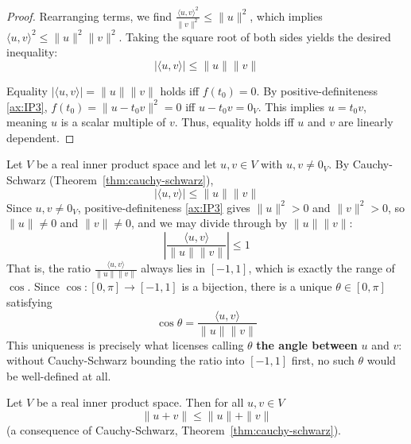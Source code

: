 \begin{proof}
			Rearranging terms, we find $\frac{\langle u, v \rangle^2}{\|v\|^2} \le \|u\|^2$, which implies $\langle u, v \rangle^2 \le \|u\|^2 \|v\|^2$. Taking the square root of both sides yields the desired inequality:
			\[ 
				|\langle u, v \rangle| \le \|u\| \|v\|
			\]
			
			Equality $|\langle u, v \rangle| = \|u\| \|v\|$ holds iff $f(t_0) = 0$. By positive-definiteness \ref{ax:IP3}, $f(t_0) = \|u - t_0v\|^2 = 0$ iff $u - t_0v = 0_V$. This implies $u = t_0v$, meaning $u$ is a scalar multiple of $v$. Thus, equality holds iff $u$ and $v$ are linearly dependent.
		\end{proof}
		
		\begin{remark}
			\label{rem:angle-between-vectors}
			Let $V$ be a real inner product space and let $u, v \in V$ with $u, v \neq 0_V$. By Cauchy-Schwarz (Theorem~\ref{thm:cauchy-schwarz}),
			\[
				|\langle u, v \rangle| \le \|u\|\|v\|
			\]
			Since $u, v \neq 0_V$, positive-definiteness \ref{ax:IP3} gives $\|u\|^2 > 0$ and $\|v\|^2 > 0$, so $\|u\| \neq 0$ and $\|v\| \neq 0$, and we may divide through by $\|u\|\|v\|$:
			\[
				\left| \frac{\langle u,v \rangle}{\|u\|\|v\|} \right| \le 1
			\]
			That is, the ratio $\frac{\langle u, v \rangle}{\|u\|\|v\|}$ always lies in $[-1,1]$, which is exactly the range of $\cos$. Since $\cos : [0,\pi] \to [-1,1]$ is a bijection, there is a unique $\theta \in [0,\pi]$ satisfying
			\[
				\cos\theta = \frac{\langle u,v \rangle}{\|u\|\|v\|}
			\]
			This uniqueness is precisely what licenses calling $\theta$ \textbf{the angle between} $u$ and $v$: without Cauchy-Schwarz bounding the ratio into $[-1,1]$ first, no such $\theta$ would be well-defined at all.
		\end{remark}
		
		\begin{proposition}
			\label{prop:triangle-inequality}
			Let $V$ be a real inner product space. Then for all $u, v \in V$
			\[
				\|u+v\| \le \|u\| + \|v\|
			\]
			(a consequence of Cauchy-Schwarz, Theorem~\ref{thm:cauchy-schwarz}).
		\end{proposition}
		

